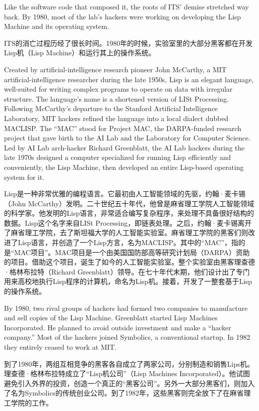 \ifdefined\eng
Like the software code that composed it, the roots of ITS' demise stretched way back.  By 1980, most of the lab's hackers were working on developing the Lisp Machine and its operating system.
\fi

\ifdefined\chs
ITS的消亡过程历经了很长时间。1980年的时候，实验室里的大部分黑客都在开发Lisp机（Lisp Machine）和运行其上的操作系统。
\fi

\ifdefined\eng
Created by artificial-intelligence research pioneer John McCarthy, a MIT artificial-intelligence researcher during the late 1950s, Lisp is an elegant language, well-suited for writing complex programs to operate on data with irregular structure. The language's name is a shortened version of LISt Processing. Following McCarthy's departure to the Stanford Artificial Intelligence Laboratory, MIT hackers refined the language into a local dialect dubbed MACLISP. The ``MAC'' stood for Project MAC, the DARPA-funded research project that gave birth to the AI Lab and the Laboratory for Computer Science. Led by AI Lab arch-hacker Richard Greenblatt, the AI Lab hackers during the late 1970s designed a computer specialized for running Lisp efficiently and conveniently, the Lisp Machine, then developed an entire Lisp-based operating system for it.
\fi

\ifdefined\chs
Lisp是一种非常优雅的编程语言。它最初由人工智能领域的先驱，约翰·麦卡锡（John McCarthy）发明。二十世纪五十年代，他曾是麻省理工学院人工智能领域的科学家。他发明的Lisp语言，非常适合编写复杂程序，来处理不具备很好结构的数据。Lisp这个名字来自LISt Processing，即链表处理。之后，约翰·麦卡锡离开了麻省理工学院，去了斯坦福大学的人工智能实验室。麻省理工学院的黑客们则改进了Lisp语言，并创造了一个Lisp方言，名为MACLISP。其中的“MAC”，指的是“MAC项目”。MAC项目是一个由美国国防部高等研究计划局（DARPA）资助的项目。借助这个项目，诞生了如今的人工智能实验室。整个实验室由黑客理查德·格林布拉特（Richard Greenblatt）领导。在七十年代末期，他们设计出了专门用来高校地执行Lisp程序的计算机，命名为Lisp机。接着，开发了一整套基于Lisp的操作系统。
\fi

\ifdefined\eng
By 1980, two rival groups of hackers had formed two companies to manufacture and sell copies of the Lisp Machine.  Greenblatt started Lisp Machines Incorporated.  He planned to avoid outside investment and make a ``hacker company.''  Most of the hackers joined Symbolics, a conventional startup.  In 1982 they entirely ceased to work at MIT.
\fi

\ifdefined\chs
到了1980年，两组互相竞争的黑客各自成立了两家公司，分别制造和销售Lips机。理查德·格林布拉特成立了“Lisp机公司”（Lisp Machines Incorporated）。他试图避免引入外界的投资，创造一个真正的“黑客公司”。另外一大部分黑客们，则加入了名为Symbolics的传统创业公司。到了1982年，这些黑客则完全放下了在麻省理工学院的工作。
\fi

